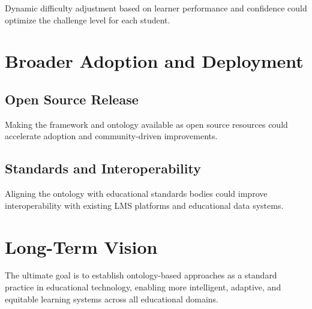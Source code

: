 Dynamic difficulty adjustment based on learner performance and confidence could optimize the challenge level for each student.

\section{Broader Adoption and Deployment}

\subsection{Open Source Release}

Making the framework and ontology available as open source resources could accelerate adoption and community-driven improvements.

\subsection{Standards and Interoperability}

Aligning the ontology with educational standards bodies could improve interoperability with existing LMS platforms and educational data systems.

\section{Long-Term Vision}

The ultimate goal is to establish ontology-based approaches as a standard practice in educational technology, enabling more intelligent, adaptive, and equitable learning systems across all educational domains.
